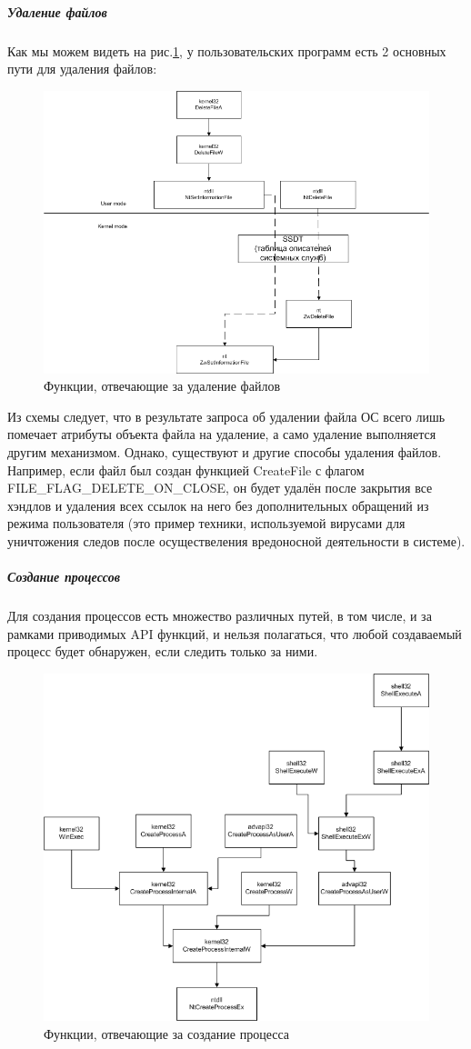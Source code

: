 \subparagraph {Удаление файлов}
Как мы можем видеть на рис.\ref{fig:filedelete}, у пользовательских программ есть 2 основных пути
для удаления файлов:
\begin {figure}[h]
	\centering
	\includegraphics[width=\linewidth]{img/DeleteFileAPIs.png}
	\caption{Функции, отвечающие за удаление файлов}
	\label{fig:filedelete}
\end {figure}
Из схемы следует, что в результате запроса об удалении файла ОС всего лишь помечает атрибуты объекта файла на удаление, а само удаление выполняется другим механизмом. Однако, существуют и другие способы удаления файлов. Например, если файл был создан функцией CreateFile с флагом FILE\_FLAG\_DELETE\_ON\_CLOSE, он будет удалён после закрытия все хэндлов и удаления всех ссылок на него без дополнительных обращений из режима пользователя (это пример техники, используемой вирусами для уничтожения следов после осуществеления вредоносной деятельности в системе).
\subparagraph {Создание процессов}
Для создания процессов есть множество различных путей, в том числе, и за рамками приводимых API функций, и нельзя полагаться, что любой создаваемый процесс будет обнаружен, если следить только за ними.
\begin {figure}[h]
	\centering
	\includegraphics[width=\linewidth]{img/ExampleProcessCreateAPIs.png}
	\caption{Функции, отвечающие за создание процесса}
	\label{fig:createprocess}
\end {figure}